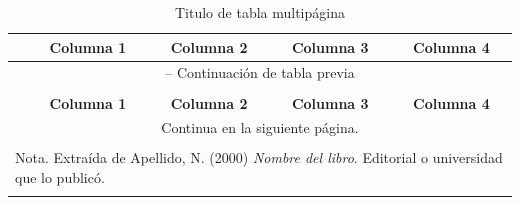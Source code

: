 \begin{longtable}{p{2cm}|p{3cm}|p{3cm}|p{3cm}|p{3cm}|}
    \caption{Titulo de tabla multipágina} \label{tabla:tabla_largo_ejemplo} \\
    \cline{2-5}
    \multicolumn{1}{l|}{} & \multicolumn{1}{c|}{\textbf{Columna 1}} & \multicolumn{1}{c|}{\textbf{Columna 2}} & \multicolumn{1}{c|}{\textbf{Columna 3}} & \multicolumn{1}{c|}{\textbf{Columna 4}}\\ \hline
    \endfirsthead

    \multicolumn{5}{c}{{\tablename{} \thetable{} -- Continuación de tabla previa}} \\
    \multicolumn{5}{l}{} \\
    \cline{2-5}
    \multicolumn{1}{l|}{} & \multicolumn{1}{c|}{\textbf{Columna 1}} & \multicolumn{1}{c|}{\textbf{Columna 2}} & \multicolumn{1}{c|}{\textbf{Columna 3}} & \multicolumn{1}{c|}{\textbf{Columna 4}}\\ \hline
    \endhead

    \multicolumn{5}{c}{{Continua en la siguiente página.}} \\
    \endfoot

    \multicolumn{5}{l}{} \\
    \multicolumn{5}{l}{Nota. Extraída de Apellido, N. (2000) \textit{Nombre del libro}. Editorial o universidad que lo publicó.} \\
    \endlastfoot


\end{longtable}
